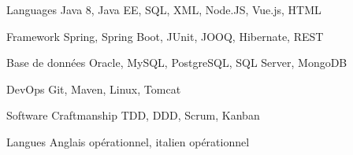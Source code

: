 

\begin{cvskills}

  \cvskill
    {Languages} %
    {Java 8, Java EE, SQL, XML, Node.JS, Vue.js, HTML} %

  \cvskill
    {Framework} %
    {Spring, Spring Boot, JUnit, JOOQ, Hibernate, REST} %

  \cvskill
    {Base de données} %
    {Oracle, MySQL, PostgreSQL, SQL Server, MongoDB} %


  \cvskill
    {DevOps} %
    {Git, Maven, Linux, Tomcat} %

  \cvskill
    {Software Craftmanship} %
    {TDD, DDD, Scrum, Kanban} %

  \cvskill
    {Langues} %
    {Anglais opérationnel, italien opérationnel} %

\end{cvskills}